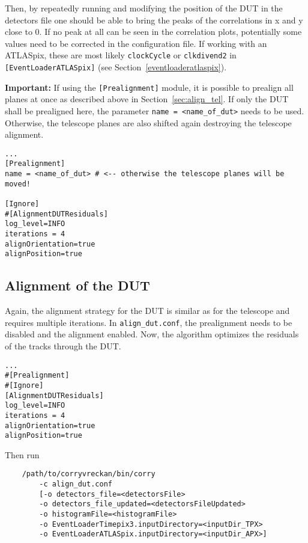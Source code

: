 Then, by repeatedly running \corry and modifying the position of the DUT in the detectors file one should be able to bring the peaks of the correlations in x and y close to 0.
If no peak at all can be seen in the correlation plots, potentially some values need to be corrected in the configuration file.
If working with an ATLASpix, these are most likely \texttt{clockCycle} or \texttt{clkdivend2} in \texttt{[EventLoaderATLASpix]} (see Section~\ref{eventloaderatlaspix}).

\textbf{Important: }If using the \texttt{[Prealignment]} module, it is possible to prealign all planes at once as described above in Section~\ref{sec:align_tel}.
If only the DUT shall be prealigned here, the parameter \texttt{name = <name\_of\_dut>} needs to be used.
Otherwise, the telescope planes are also shifted again destroying the telescope alignment.

\begin{verbatim}
...
[Prealignment]
name = <name_of_dut> # <-- otherwise the telescope planes will be moved!

[Ignore]
#[AlignmentDUTResiduals]
log_level=INFO
iterations = 4
alignOrientation=true
alignPosition=true
\end{verbatim}

\subsection*{Alignment of the DUT}
Again, the alignment strategy for the DUT is similar as for the telescope and requires multiple iterations.
In \texttt{align\_dut.conf}, the prealignment needs to be disabled and the alignment enabled.
Now, the algorithm optimizes the residuals of the tracks through the DUT.

\begin{verbatim}
...
#[Prealignment]
#[Ignore]
[AlignmentDUTResiduals]
log_level=INFO
iterations = 4
alignOrientation=true
alignPosition=true
\end{verbatim}

Then run
\begin{verbatim}
    /path/to/corryvreckan/bin/corry 
    	-c align_dut.conf 
    	[-o detectors_file=<detectorsFile> 
    	-o detectors_file_updated=<detectorsFileUpdated> 
    	-o histogramFile=<histogramFile> 
    	-o EventLoaderTimepix3.inputDirectory=<inputDir_TPX>
    	-o EventLoaderATLASpix.inputDirectory=<inputDir_APX>]
\end{verbatim}

